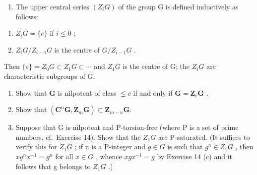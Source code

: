 \begin{enumerate}
\def\labelenumi{\arabic{enumi}.}
\setcounter{enumi}{17}
\tightlist
\item
  The upper central series \((Z_{i}G)\) of the group G is defined inductively as follows:
\end{enumerate}

\begin{enumerate}
\def\labelenumi{(\roman{enumi})}
\item
  \(Z_{i}G = \{e\}\) if \(i \leqslant 0\) ;
\item
  \(Z_{i}G/Z_{i-1}G\) is the centre of \(G/Z_{i-1}G\) .
\end{enumerate}

Then \(\{e\} = Z_0G \subset Z_1G \subset \cdots\) and \(Z_1G\) is the centre of G; the \(Z_iG\) are characteristic subgroups of G.

\begin{enumerate}
\def\labelenumi{(\alph{enumi})}
\item
  Show that \(\mathbf{G}\) is nilpotent of class \(\leqslant c\) if and only if \(\mathbf{G} = \mathbf{Z}_c\mathbf{G}\) .
\item
  Show that \((\mathbf{C}^n\mathbf{G},\bar{\mathbf{Z}}_m\mathbf{G})\subset \mathbf{Z}_{m - n}\mathbf{G}.\)
\item
  Suppose that G is nilpotent and P-torsion-free (where P is a set of prime numbers, cf.~Exercise 14). Show that the \(Z_{1}G\) are P-saturated. (It suffices to verify this for \(Z_{1}G\) ; if n is a P-integer and \(g \in G\) is such that \(g^{n} \in Z_{1}G\) , then \(xg^{n}x^{-1} = g^{n}\) for all \(x \in G\) , whence \(xgx^{-1} = g\) by Exercise 14 (c) and it follows that g belongs to \(Z_{1}G\) .)
\end{enumerate}

